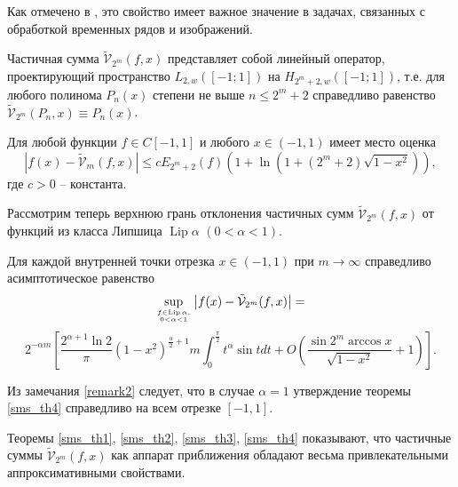 \noindent Как отмечено в \cite{sob-leg-sharap3},
это свойство имеет важное значение в задачах, связанных с обработкой временных рядов и изображений.

\begin{theorem} \label{sms_th2}
  Частичная сумма $\tilde{\mathcal{V}}_{2^m}(f,x)$ представляет собой линейный оператор, проектирующий пространство $L_{2, w}([-1; 1])$ на $H_{2^m+2, w}([-1; 1])$, т.е. для любого полинома $P_n(x)$ степени не выше $n\le 2^{m}+2$ справедливо равенство $\tilde{\mathcal{V}}_{2^m}(P_n,x) \equiv P_n(x)$.
\end{theorem}


\begin{theorem} \label{sms_th3}
  Для любой функции $f\in C[-1,1]$ и любого $x \in (-1, 1)$ имеет место оценка
\begin{equation*}
\label{sms1thrm3eq}
|f(x)-\tilde{\mathcal{V}}_m(f,x)|\le c E_{2^{m}+2}(f)(1+\ln(1+(2^{m}+2)\sqrt{1-x^2})),
\end{equation*}
где $c >0$ -- константа.
\end{theorem}


Рассмотрим теперь верхнюю грань отклонения частичных сумм $\tilde{\mathcal{V}}_{2^m}(f,x)$ от функций из класса Липшица $\operatorname{Lip} \alpha$ $(0< \alpha <1)$.

\begin{theorem} \label{sms_th4}
  Для каждой внутренней точки отрезка $x \in (-1, 1)$ при $m \rightarrow \infty$ справедливо асимптотическое равенство
\begin{equation*}
\sup_{f \in \operatorname{Lip}{\alpha}, \atop 0 < \alpha < 1} \left| f(x) - \tilde{\mathcal{V}}_{2^m}(f,x) \right| =
\end{equation*}
\begin{equation*}
\label{sms1thrm4eq}
2^{-\alpha m} \left[
\frac{2^{\alpha+1}\ln{2}}{\pi} \left( 1-x^2 \right)^{\frac{\alpha}{2}+1}m
\int_{0}^{\frac{\pi}{2}} t^{\alpha} \sin{t} dt +
O \left( \frac{\sin{2^{m} \arccos {x}}}{\sqrt{1-x^2}} + 1\right)
\right].
\end{equation*}
\end{theorem}

\begin{remark} \label{remark2}
Из замечания \ref{remark2} следует, что в случае $\alpha = 1$ утверждение теоремы \ref{sms_th4} справедливо на всем отрезке $[-1, 1]$.
\end{remark}



Теоремы \ref{sms_th1}, \ref{sms_th2}, \ref{sms_th3}, \ref{sms_th4} показывают, что частичные суммы $\tilde{\mathcal{V}}_{2^m}(f,x)$ как аппарат приближения обладают весьма привлекательными аппроксимативными свойствами.
